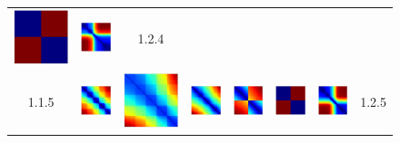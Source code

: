 \documentclass[bachelor, nocolorlinks, printoneside]{seuthesis} %
\begin{document}
\begin{Main}
\begin{figure}[ht!]
\begin{centering}
\begin{tabular}{cccc|cccc}
        \includegraphics[width=0.12\columnwidth,keepaspectratio]{figs/toyset_matrices/cluster_2by10_4_2.png} &
        \includegraphics[width=0.12\columnwidth,keepaspectratio]{figs/toyset_matrices/cluster_2by10_4_3.png} & 1.2.4\\
        1.1.5 &\includegraphics[width=0.12\columnwidth,keepaspectratio]{figs/toyset_matrices/cluster_5by20_5_1.png} &
        \includegraphics[width=0.12\columnwidth,keepaspectratio]{figs/toyset_matrices/cluster_5by20_5_2.png} &
        \includegraphics[width=0.12\columnwidth,keepaspectratio]{figs/toyset_matrices/cluster_5by20_5_3.png} &  
        \includegraphics[width=0.12\columnwidth,keepaspectratio]{figs/toyset_matrices/cluster_2by10_5_1.png} &
        \includegraphics[width=0.12\columnwidth,keepaspectratio]{figs/toyset_matrices/cluster_2by10_5_2.png} &
        \includegraphics[width=0.12\columnwidth,keepaspectratio]{figs/toyset_matrices/cluster_2by10_5_3.png}& 1.2.5\\

\end{tabular}
\end{centering}
\end{figure}
\end{Main}
\end{document}
